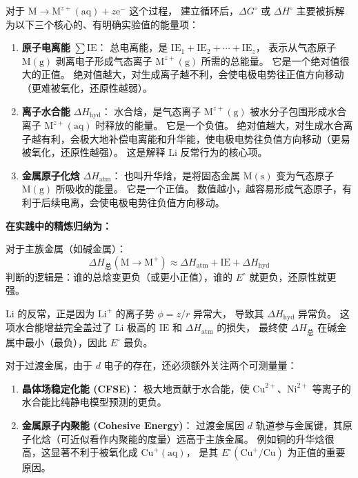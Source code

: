 \documentclass[UTF8]{ctexbook}
\begin{document}
对于 $\mathrm{M} \rightarrow \mathrm{M}^{z+}(\mathrm{aq}) + z\mathrm{e}^{-}$ 这个过程，
建立循环后，$\Delta G^\circ$ 或 $\Delta H^\circ$ 主要被拆解为以下三个核心的、有明确实验值的能量项：

\begin{enumerate}
    \item \textbf{原子电离能} $\sum \mathrm{IE}$：
    总电离能，是 $\mathrm{IE}_1 + \mathrm{IE}_2 + \cdots + \mathrm{IE}_z$，
    表示从气态原子 $\mathrm{M(g)}$ 剥离电子形成气态离子 $\mathrm{M}^{z+}(\mathrm{g})$ 所需的总能量。
    它是一个绝对值很大的正值。
    绝对值越大，对生成离子越不利，会使电极电势往正值方向移动（更难被氧化，还原性越弱）。

    \item \textbf{离子水合能} $\Delta H_{\mathrm{hyd}}$：
    水合焓，是气态离子 $\mathrm{M}^{z+}(\mathrm{g})$ 被水分子包围形成水合离子 $\mathrm{M}^{z+}(\mathrm{aq})$ 时释放的能量。
    它是一个负值。
    绝对值越大，对生成水合离子越有利，会极大地补偿电离能和升华能，使电极电势往负值方向移动（更易被氧化，还原性越强）。
    这是解释 $\mathrm{Li}$ 反常行为的核心项。

    \item \textbf{金属原子化焓} $\Delta H_{\mathrm{atm}}$：
    也叫升华焓，是将固态金属 $\mathrm{M(s)}$ 变为气态原子 $\mathrm{M(g)}$ 所吸收的能量。
    它是一个正值。
    数值越小，越容易形成气态原子，有利于后续电离，会使电极电势往负值方向移动。
\end{enumerate}

\noindent\textbf{在实践中的精炼归纳为：}

对于主族金属（如碱金属）：
\[
\Delta H_{\text{总}} (\mathrm{M} \rightarrow \mathrm{M}^{+}) \approx \Delta H_{\mathrm{atm}} + \mathrm{IE} + \Delta H_{\mathrm{hyd}}
\]
判断的逻辑是：谁的总焓变更负（或更小正值），谁的 $E^\circ$ 就更负，还原性就更强。

$\mathrm{Li}$ 的反常，正是因为 $\mathrm{Li}^{+}$ 的离子势 $\phi = z/r$ 异常大，
导致其 $\Delta H_{\mathrm{hyd}}$ 异常负。
这项水合能增益完全盖过了 $\mathrm{Li}$ 极高的 $\mathrm{IE}$ 和 $\Delta H_{\mathrm{atm}}$ 的损失，
最终使 $\Delta H_{\text{总}}$ 在碱金属中最小（最负），因此 $E^\circ$ 最负。

对于过渡金属，由于 $d$ 电子的存在，还必须额外关注两个可测量量：
\begin{enumerate}
    \item \textbf{晶体场稳定化能 (CFSE)}：
    极大地贡献于水合能，使 $\mathrm{Cu}^{2+}$、$\mathrm{Ni}^{2+}$ 等离子的水合能比纯静电模型预测的更负。

    \item \textbf{金属原子内聚能 (Cohesive Energy)}：
    过渡金属因 $d$ 轨道参与金属键，其原子化焓（可近似看作内聚能的度量）远高于主族金属。
    例如铜的升华焓很高，这显著不利于被氧化成 $\mathrm{Cu}^{+}(\mathrm{aq})$，
    是其 $E^\circ(\mathrm{Cu}^{+}/\mathrm{Cu})$ 为正值的重要原因。
\end{enumerate}
\end{document}
